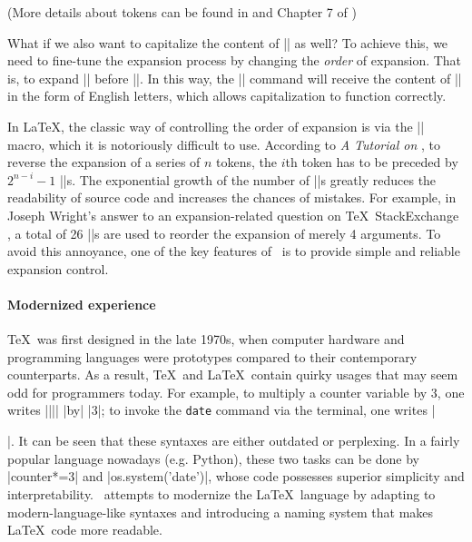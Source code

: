 \documentclass{ltugboat}
\begin{document}
(More details about tokens can be found in and Chapter 7 of \cite{knuth1984texbook})


What if we also want to capitalize the content of \inltex|\myname| as 
well? To achieve this, we need to fine-tune the expansion process by 
changing the \emph{order} of expansion. That is, to expand 
\inltex|\myname| before \inltex|\uppercase|. In this way, the 
\inltex|\uppercase| command will receive the content of 
\inltex|\myname| in the form of English letters, which allows 
capitalization to function correctly.

In \LaTeX, the classic way of controlling the order of expansion is
via the \inltex|\expandafter| macro, which it is notoriously
difficult to use. According to \emph{A Tutorial on } 
\cite{bechtolsheim1988tutorial}, to reverse the expansion of a series
of $n$ tokens, the $i$th token has to be preceded by $2^{n-i}-1$
\inltex|\expandafter|s. The exponential growth of the number of 
\inltex|\expandafter|s greatly reduces the readability of source code
and increases the chances of mistakes. 
For example, in Joseph Wright's answer to an expansion-related
question on \TeX\ StackExchange \cite{tex-se-expanding}, a total of 26 
\inltex|\expandafter|s are used to reorder the expansion of merely 4
arguments.  To avoid this annoyance, one of the key features
of \liii\ is to provide simple and reliable expansion control.



\paragraph{Modernized experience} \TeX\ was first designed in the late 1970s, when
computer hardware and programming languages were prototypes compared to
their contemporary counterparts. As a result, \TeX\ and \LaTeX\ contain
quirky usages that may seem odd for programmers today. For example, to
multiply a counter variable by 3, one writes 
\inltex|\multiply|\inltex|\counter| \inltex|by| \inltex|3|; to invoke the \verb|date| command via
the terminal, one writes \inltex|\immediate{}|. 
It can be seen that these syntaxes are either outdated or perplexing. 
In a fairly popular language nowadays 
(e.g. Python), these two tasks can be done by \inlpy|counter*=3|
and \inlpy|os.system('date')|, whose code possesses superior
simplicity and interpretability. \liii\ attempts to modernize 
the \LaTeX\ language by adapting to modern-language-like syntaxes
and introducing a naming system that makes \LaTeX\ code more
readable.
\end{document}
